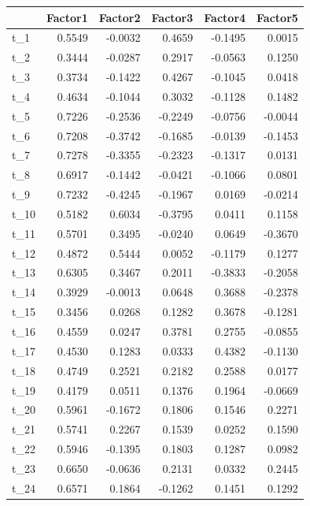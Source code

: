 \documentclass[
]{article}
\theoremstyle{plain}
\begin{document}
\begin{longtable}[]{@{}lrrrrr@{}}
\toprule\noalign{}
& Factor1 & Factor2 & Factor3 & Factor4 & Factor5 \\
\midrule\noalign{}
\endhead
\bottomrule\noalign{}
\endlastfoot
t\_1 & 0.5549 & -0.0032 & 0.4659 & -0.1495 & 0.0015 \\
t\_2 & 0.3444 & -0.0287 & 0.2917 & -0.0563 & 0.1250 \\
t\_3 & 0.3734 & -0.1422 & 0.4267 & -0.1045 & 0.0418 \\
t\_4 & 0.4634 & -0.1044 & 0.3032 & -0.1128 & 0.1482 \\
t\_5 & 0.7226 & -0.2536 & -0.2249 & -0.0756 & -0.0044 \\
t\_6 & 0.7208 & -0.3742 & -0.1685 & -0.0139 & -0.1453 \\
t\_7 & 0.7278 & -0.3355 & -0.2323 & -0.1317 & 0.0131 \\
t\_8 & 0.6917 & -0.1442 & -0.0421 & -0.1066 & 0.0801 \\
t\_9 & 0.7232 & -0.4245 & -0.1967 & 0.0169 & -0.0214 \\
t\_10 & 0.5182 & 0.6034 & -0.3795 & 0.0411 & 0.1158 \\
t\_11 & 0.5701 & 0.3495 & -0.0240 & 0.0649 & -0.3670 \\
t\_12 & 0.4872 & 0.5444 & 0.0052 & -0.1179 & 0.1277 \\
t\_13 & 0.6305 & 0.3467 & 0.2011 & -0.3833 & -0.2058 \\
t\_14 & 0.3929 & -0.0013 & 0.0648 & 0.3688 & -0.2378 \\
t\_15 & 0.3456 & 0.0268 & 0.1282 & 0.3678 & -0.1281 \\
t\_16 & 0.4559 & 0.0247 & 0.3781 & 0.2755 & -0.0855 \\
t\_17 & 0.4530 & 0.1283 & 0.0333 & 0.4382 & -0.1130 \\
t\_18 & 0.4749 & 0.2521 & 0.2182 & 0.2588 & 0.0177 \\
t\_19 & 0.4179 & 0.0511 & 0.1376 & 0.1964 & -0.0669 \\
t\_20 & 0.5961 & -0.1672 & 0.1806 & 0.1546 & 0.2271 \\
t\_21 & 0.5741 & 0.2267 & 0.1539 & 0.0252 & 0.1590 \\
t\_22 & 0.5946 & -0.1395 & 0.1803 & 0.1287 & 0.0982 \\
t\_23 & 0.6650 & -0.0636 & 0.2131 & 0.0332 & 0.2445 \\
t\_24 & 0.6571 & 0.1864 & -0.1262 & 0.1451 & 0.1292 \\
\end{longtable}
\end{document}
